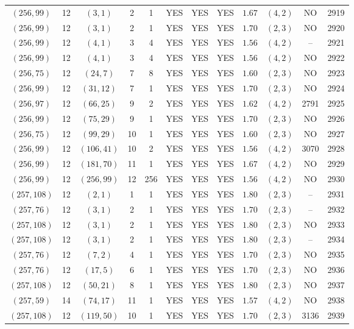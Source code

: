 \begin{longtable}{|c|c|c|c|c|c|c|c|c|c|c|c|}
$(256,99)$ & 12 & $(3,1)$ & 2 & 1 & YES & YES & YES & $1.67$ & $(4,2)$ & NO & 2919\\
$(256,99)$ & 12 & $(3,1)$ & 2 & 1 & YES & YES & YES & $1.70$ & $(2,3)$ & NO & 2920\\
$(256,99)$ & 12 & $(4,1)$ & 3 & 4 & YES & YES & YES & $1.56$ & $(4,2)$ & -- & 2921\\
$(256,99)$ & 12 & $(4,1)$ & 3 & 4 & YES & YES & YES & $1.56$ & $(4,2)$ & NO & 2922\\
$(256,75)$ & 12 & $(24,7)$ & 7 & 8 & YES & YES & YES & $1.60$ & $(2,3)$ & NO & 2923\\
$(256,99)$ & 12 & $(31,12)$ & 7 & 1 & YES & YES & YES & $1.70$ & $(2,3)$ & NO & 2924\\
$(256,97)$ & 12 & $(66,25)$ & 9 & 2 & YES & YES & YES & $1.62$ & $(4,2)$ & 2791 & 2925\\
$(256,99)$ & 12 & $(75,29)$ & 9 & 1 & YES & YES & YES & $1.70$ & $(2,3)$ & NO & 2926\\
$(256,75)$ & 12 & $(99,29)$ & 10 & 1 & YES & YES & YES & $1.60$ & $(2,3)$ & NO & 2927\\
$(256,99)$ & 12 & $(106,41)$ & 10 & 2 & YES & YES & YES & $1.56$ & $(4,2)$ & 3070 & 2928\\
$(256,99)$ & 12 & $(181,70)$ & 11 & 1 & YES & YES & YES & $1.67$ & $(4,2)$ & NO & 2929\\
$(256,99)$ & 12 & $(256,99)$ & 12 & 256 & YES & YES & YES & $1.56$ & $(4,2)$ & NO & 2930\\
$(257,108)$ & 12 & $(2,1)$ & 1 & 1 & YES & YES & YES & $1.80$ & $(2,3)$ & -- & 2931\\
$(257,76)$ & 12 & $(3,1)$ & 2 & 1 & YES & YES & YES & $1.70$ & $(2,3)$ & -- & 2932\\
$(257,108)$ & 12 & $(3,1)$ & 2 & 1 & YES & YES & YES & $1.80$ & $(2,3)$ & NO & 2933\\
$(257,108)$ & 12 & $(3,1)$ & 2 & 1 & YES & YES & YES & $1.80$ & $(2,3)$ & -- & 2934\\
$(257,76)$ & 12 & $(7,2)$ & 4 & 1 & YES & YES & YES & $1.70$ & $(2,3)$ & NO & 2935\\
$(257,76)$ & 12 & $(17,5)$ & 6 & 1 & YES & YES & YES & $1.70$ & $(2,3)$ & NO & 2936\\
$(257,108)$ & 12 & $(50,21)$ & 8 & 1 & YES & YES & YES & $1.80$ & $(2,3)$ & NO & 2937\\
$(257,59)$ & 14 & $(74,17)$ & 11 & 1 & YES & YES & YES & $1.57$ & $(4,2)$ & NO & 2938\\
$(257,108)$ & 12 & $(119,50)$ & 10 & 1 & YES & YES & YES & $1.70$ & $(2,3)$ & 3136 & 2939\\

\end{longtable}
